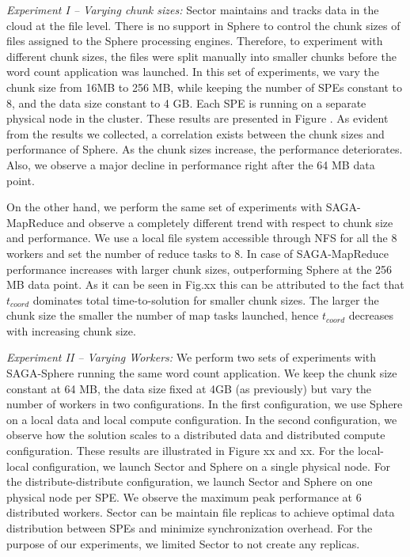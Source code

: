 \documentclass[3p,twocolumn]{elsarticle}
\begin{document}
{\it Experiment I -- Varying chunk sizes:} Sector maintains and tracks
data in the cloud at the file level. There is no support in Sphere to
control the chunk sizes of files assigned to the Sphere processing
engines. Therefore, to experiment with different chunk sizes, the
files were split manually into smaller chunks before the word count
application was launched. In this set of experiments, we vary the
chunk size from 16MB to 256 MB, while keeping the number of SPEs
constant to 8, and the data size constant to 4 GB. Each SPE is running
on a separate physical node in the cluster. These results are
presented in Figure \FIXME{}. As evident from the results we collected, a
correlation exists between the chunk sizes and performance of Sphere.
As the chunk sizes increase, the performance deteriorates. Also, we
observe a major decline in performance right after the 64 MB data
point. 

On the other hand, we perform the same set of experiments with
SAGA-MapReduce and observe a completely different trend with respect
to chunk size and performance. We use a local file system accessible
through NFS for all the 8 workers and set the number of reduce tasks to 8.
In case of SAGA-MapReduce performance increases with larger chunk sizes,
outperforming Sphere at the 256 MB data point. As it can be seen in Fig.xx
this can be attributed to the fact that $t_{coord}$ dominates total
time-to-solution for smaller chunk sizes. The larger the chunk size the
smaller the number of map tasks launched, hence $t_{coord}$ decreases with
increasing chunk size.


{\it Experiment II -- Varying Workers:} We perform two sets of
experiments with SAGA-Sphere running the same word count application.
We keep the chunk size constant at 64 MB, the
data size fixed at 4GB (as previously) but vary the number of
workers in two configurations. In the first configuration, we use Sphere 
on a local data and local compute configuration. In the second configuration, we 
observe how the solution scales to a distributed data and distributed compute
configuration. These results are illustrated in Figure xx and xx.  For
the local-local configuration, we launch Sector and Sphere on a single
physical node. For the distribute-distribute configuration, we launch
Sector and Sphere on one physical node per SPE.  We observe the
maximum peak performance at 6 distributed workers. Sector can be maintain 
file replicas to achieve optimal data distribution between SPEs and minimize
synchronization overhead. For the purpose of our experiments, we
limited Sector to not create any replicas.
\end{document}
